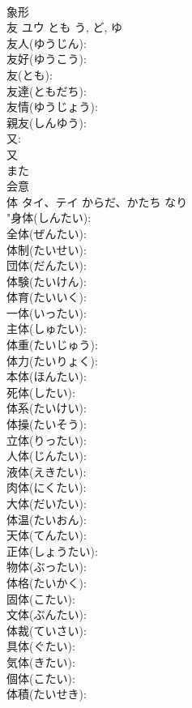 \documentclass[8pt]{extreport}
\begin{document}
\begin{CJK}{UTF8}{min}
\\	象形 
\\	友	ユウ	とも	う, ど, ゆ	
\\	友人(ゆうじん): 
\\	友好(ゆうこう): 
\\	友(とも): 
\\	友達(ともだち): 
\\	友情(ゆうじょう): 
\\	親友(しんゆう): 
\\	又: 
\\	又	
\\	また	
\\	会意 
\\	体	タイ、テイ	からだ、かたち	なり	
\\	"身体(しんたい): 
\\	全体(ぜんたい): 
\\	体制(たいせい): 
\\	団体(だんたい): 
\\	体験(たいけん): 
\\	体育(たいいく): 
\\	一体(いったい): 
\\	主体(しゅたい): 
\\	体重(たいじゅう): 
\\	体力(たいりょく): 
\\	本体(ほんたい): 
\\	死体(したい): 
\\	体系(たいけい): 
\\	体操(たいそう): 
\\	立体(りったい): 
\\	人体(じんたい): 
\\	液体(えきたい): 
\\	肉体(にくたい): 
\\	大体(だいたい): 
\\	体温(たいおん): 
\\	天体(てんたい): 
\\	正体(しょうたい): 
\\	物体(ぶったい): 
\\	体格(たいかく): 
\\	固体(こたい): 
\\	文体(ぶんたい): 
\\	体裁(ていさい): 
\\	具体(ぐたい): 
\\	気体(きたい): 
\\	個体(こたい): 
\\	体積(たいせき): 

\end{CJK}
\end{document}
